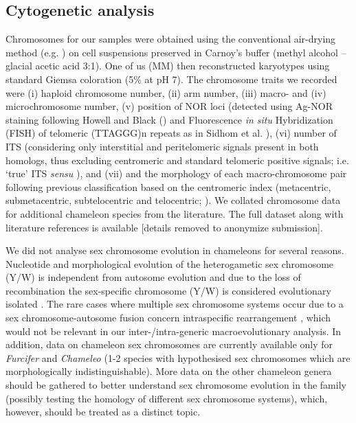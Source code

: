 \documentclass[a4paper, 12pt]{article}
\begin{document}
\subsection{Cytogenetic analysis}
Chromosomes for our samples were obtained using the conventional air-drying method (e.g. \citealt{sidhom2020karyological}) on cell suspensions preserved in Carnoy’s buffer (methyl alcohol – glacial acetic acid 3:1). 
One of us (MM) then reconstructed karyotypes using standard Giemsa coloration (5\% at pH 7). 
The chromosome traits we recorded were (i) haploid chromosome number, (ii) arm number, (iii) macro- and (iv) microchromosome number, (v) position of NOR loci (detected using Ag-NOR staining following Howell and Black (\citeyear{howell1980controlled}) and Fluorescence \textit{in situ} Hybridization (FISH) of telomeric (TTAGGG)n repeats as in Sidhom et al. \citeyear{sidhom2020karyological}), (vi) number of ITS (considering only interstitial and peritelomeric signals present in both homologs, thus excluding centromeric and standard telomeric positive signals; i.e. `true' ITS \textit{sensu} \citealt{bolzan2012chromosomal,chirino2017chromosomal}), and (vii) and the morphology of each macro-chromosome pair following previous classification based on the centromeric index (metacentric, submetacentric, subtelocentric and telocentric; \citealt{levan1964nomenclature}). 
We collated chromosome data for additional chameleon species from the literature. 
The full dataset along with literature references is available [details removed to anonymize submission].

We did not analyse sex chromosome evolution in chameleons for several reasons. 
Nucleotide and morphological evolution of the heterogametic sex chromosome (Y/W) is independent from autosome evolution and due to the loss of recombination the sex-specific chromosome (Y/W) is considered evolutionary isolated \citep[see e.g.][]{ezaz2014repetitive,mezzasalma2021lizards}. 
The rare cases where multiple sex chromosome systems occur due to a sex chromosome-autosome fusion concern intraspecific rearrangement \citep[as in the case of the neo-sex chromosomes in Furcifer reported by][]{rovatsos2015female,rovatsos2017evolution,rovatsos2019zz}, which would not be relevant in our inter-/intra-generic macroevolutionary analysis. 
In addition, data on chameleon sex chromosomes are currently available only for \textit{Furcifer} \citep{rovatsos2015female,rovatsos2017evolution,rovatsos2019zz} and \textit{Chameleo} \citep{sidhom2020karyological,tishakova2022identification} (1-2 species with hypothesised sex chromosomes which are morphologically indistinguishable). 
More data on the other chameleon genera should be gathered to better understand sex chromosome evolution in the family (possibly testing the homology of different sex chromosome systems), which, however, should be treated as a distinct topic.
\end{document}
